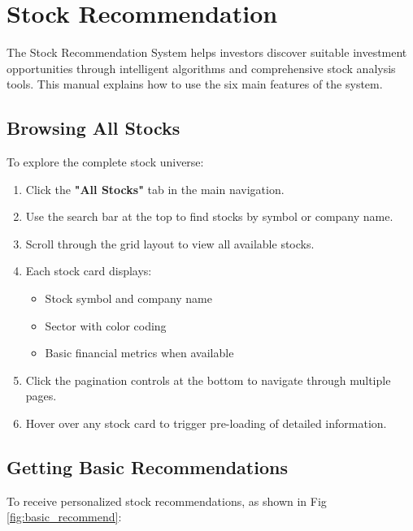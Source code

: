 \section{Stock Recommendation}

The Stock Recommendation System helps investors discover suitable investment opportunities through intelligent algorithms and comprehensive stock analysis tools. This manual explains how to use the six main features of the system.

\subsection{Browsing All Stocks}
To explore the complete stock universe:

\begin{enumerate}
    \item Click the \textbf{"All Stocks"} tab in the main navigation.
    \item Use the search bar at the top to find stocks by symbol or company name.
    \item Scroll through the grid layout to view all available stocks.
    \item Each stock card displays:
    \begin{itemize}
        \item Stock symbol and company name
        \item Sector with color coding
        \item Basic financial metrics when available
    \end{itemize}
    \item Click the pagination controls at the bottom to navigate through multiple pages.
    \item Hover over any stock card to trigger pre-loading of detailed information.
\end{enumerate}

\subsection{Getting Basic Recommendations}
To receive personalized stock recommendations, as shown in Fig \ref{fig:basic_recommend}:

